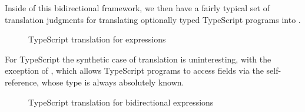 \documentclass[a4paper,USenglish]{tex/lipics-v2016}
\begin{document}
Inside of this bidirectional framework, we then have a fairly typical set of
translation judgments for translating optionally typed TypeScript programs into
\kafka.

\begin{figure}[!h]
\begin{mathpar}




\end{mathpar}
\caption{TypeScript translation for expressions}
\label{fig:tstrans_exp}
\end{figure}

For TypeScript the synthetic case of translation is uninteresting, with the 
exception of , which allows TypeScript programs to access fields
via the self-reference, whose type is always absolutely known.

\begin{figure}[!h]
\begin{mathpar}


\end{mathpar}
\caption{TypeScript translation for bidirectional expressions}
\label{fig:tstrans_exp2}
\end{figure}
\end{document}
